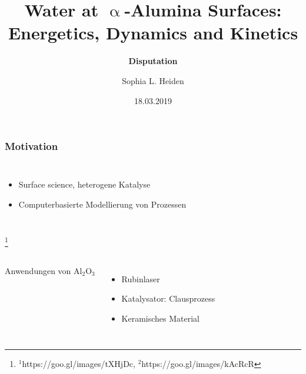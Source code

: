 \documentclass[hyperref={pdfpagelabels=false}]{beamer}
\newcommand\blfootnote[1]{%
  \begingroup
  \renewcommand\thefootnote{}\footnote{#1}%
  \addtocounter{footnote}{-1}%
  \endgroup
}
\begin{document}
\title{Water at $\upalpha$-Alumina Surfaces: Energetics, Dynamics and Kinetics}
\subtitle{{\bf Disputation}}   
\author{Sophia L. Heiden}
\date{18.03.2019}

\begin{frame}[plain]
 \addtocounter{framenumber}{-3}
\titlepage
\end{frame} 


\begin{frame}[plain]
 \frametitle{Motivation}
 \begin{columns}[c]
  \begin{itemize}
   \item Surface science, heterogene Katalyse
   \item Computerbasierte Modellierung von Prozessen
  \end{itemize}
 \end{columns}
 \blfootnote{\tiny{$^1$https://goo.gl/images/tXHjDc, $^2$https://goo.gl/images/kAcRcR}}%
 \pause
 \begin{columns}[c]
  Anwendungen von Al$_2$O$_3$
  \begin{itemize}
   \item Rubinlaser
   \item Katalysator: Clausprozess
   \item Keramisches Material

\end{itemize}
\end{columns}
\end{frame}
\end{document}
